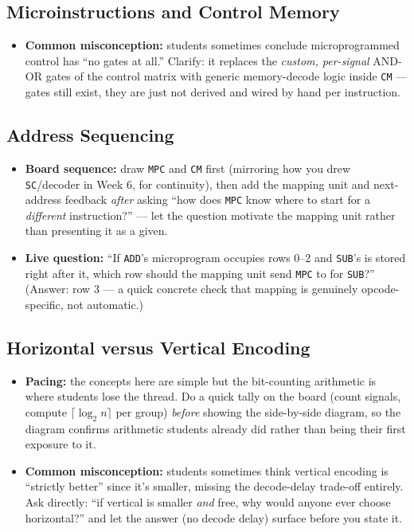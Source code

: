 \documentclass[11pt]{article}
\begin{document}
\subsection{Microinstructions and Control Memory}
\begin{itemize}
  \item \textbf{Common misconception:} students sometimes conclude microprogrammed control has ``no gates at all.'' Clarify: it replaces the \emph{custom, per-signal} AND-OR gates of the control matrix with generic memory-decode logic inside \texttt{CM} --- gates still exist, they are just not derived and wired by hand per instruction.
\end{itemize}

\subsection{Address Sequencing}
\begin{itemize}
  \item \textbf{Board sequence:} draw \texttt{MPC} and \texttt{CM} first (mirroring how you drew \texttt{SC}/decoder in Week 6, for continuity), then add the mapping unit and next-address feedback \emph{after} asking ``how does \texttt{MPC} know where to start for a \emph{different} instruction?'' --- let the question motivate the mapping unit rather than presenting it as a given.
  \item \textbf{Live question:} ``If \texttt{ADD}'s microprogram occupies rows 0--2 and \texttt{SUB}'s is stored right after it, which row should the mapping unit send \texttt{MPC} to for \texttt{SUB}?'' (Answer: row 3 --- a quick concrete check that mapping is genuinely opcode-specific, not automatic.)
\end{itemize}

\subsection{Horizontal versus Vertical Encoding}
\begin{itemize}
  \item \textbf{Pacing:} the concepts here are simple but the bit-counting arithmetic is where students lose the thread. Do a quick tally on the board (count signals, compute $\lceil \log_2 n \rceil$ per group) \emph{before} showing the side-by-side diagram, so the diagram confirms arithmetic students already did rather than being their first exposure to it.
  \item \textbf{Common misconception:} students sometimes think vertical encoding is ``strictly better'' since it's smaller, missing the decode-delay trade-off entirely. Ask directly: ``if vertical is smaller \emph{and} free, why would anyone ever choose horizontal?'' and let the answer (no decode delay) surface before you state it.
\end{itemize}
\end{document}
